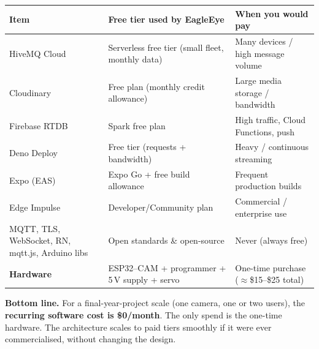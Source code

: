 \documentclass[11pt,a4paper]{article}
\begin{document}
\renewcommand{\arraystretch}{1.3}
\begin{tabularx}{\linewidth}{@{}lXl@{}}
\toprule
\textbf{Item} & \textbf{Free tier used by EagleEye} & \textbf{When you would pay} \\
\midrule
HiveMQ Cloud      & Serverless free tier (small fleet, monthly data) & Many devices / high message volume \\
Cloudinary        & Free plan (monthly credit allowance)             & Large media storage / bandwidth \\
Firebase RTDB     & Spark free plan                                  & High traffic, Cloud Functions, push \\
Deno Deploy       & Free tier (requests + bandwidth)                 & Heavy / continuous streaming \\
Expo (EAS)        & Expo Go + free build allowance                   & Frequent production builds \\
Edge Impulse      & Developer/Community plan                         & Commercial / enterprise use \\
MQTT, TLS, WebSocket, RN, mqtt.js, Arduino libs & Open standards \& open-source & Never (always free) \\
\midrule
\textbf{Hardware} & ESP32--CAM + programmer + 5\,V supply + servo    & One-time purchase ($\approx$\$15--\$25 total) \\
\bottomrule
\end{tabularx}

\vspace{0.5em}
\noindent\textbf{Bottom line.} For a final-year-project scale (one camera, one or two users),
the \textbf{recurring software cost is \$0/month}. The only spend is the one-time hardware. The
architecture scales to paid tiers smoothly if it were ever commercialised, without changing the
design.

\end{document}
